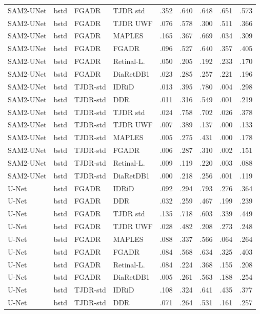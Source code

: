 \begin{landscape}
{\begin{longtable}{l l l l c c c c c}
SAM2-UNet & bstd & FGADR & TJDR std & .352 & .640 & .648 & .651 & .573 \\
SAM2-UNet & bstd & FGADR & TJDR UWF & .076 & .578 & .300 & .511 & .366 \\
SAM2-UNet & bstd & FGADR & MAPLES & .165 & .367 & .669 & .034 & .309 \\
SAM2-UNet & bstd & FGADR & FGADR & .096 & .527 & .640 & .357 & .405 \\
SAM2-UNet & bstd & FGADR & Retinal-L. & .050 & .205 & .192 & .233 & .170 \\
SAM2-UNet & bstd & FGADR & DiaRetDB1 & .023 & .285 & .257 & .221 & .196 \\
SAM2-UNet & bstd & TJDR-std & IDRiD & .013 & .395 & .780 & .004 & .298 \\
SAM2-UNet & bstd & TJDR-std & DDR & .011 & .316 & .549 & .001 & .219 \\
SAM2-UNet & bstd & TJDR-std & TJDR std & .024 & .758 & .702 & .026 & .378 \\
SAM2-UNet & bstd & TJDR-std & TJDR UWF & .007 & .389 & .137 & .000 & .133 \\
SAM2-UNet & bstd & TJDR-std & MAPLES & .005 & .275 & .431 & .000 & .178 \\
SAM2-UNet & bstd & TJDR-std & FGADR & .006 & .287 & .310 & .002 & .151 \\
SAM2-UNet & bstd & TJDR-std & Retinal-L. & .009 & .119 & .220 & .003 & .088 \\
SAM2-UNet & bstd & TJDR-std & DiaRetDB1 & .000 & .218 & .256 & .001 & .119 \\
U-Net & bstd & FGADR & IDRiD & .092 & .294 & .793 & .276 & .364 \\
U-Net & bstd & FGADR & DDR & .032 & .259 & .467 & .199 & .239 \\
U-Net & bstd & FGADR & TJDR std & .135 & .718 & .603 & .339 & .449 \\
U-Net & bstd & FGADR & TJDR UWF & .028 & .482 & .208 & .273 & .248 \\
U-Net & bstd & FGADR & MAPLES & .088 & .337 & .566 & .064 & .264 \\
U-Net & bstd & FGADR & FGADR & .084 & .568 & .634 & .325 & .403 \\
U-Net & bstd & FGADR & Retinal-L. & .084 & .224 & .368 & .155 & .208 \\
U-Net & bstd & FGADR & DiaRetDB1 & .005 & .261 & .563 & .188 & .254 \\
U-Net & bstd & TJDR-std & IDRiD & .108 & .324 & .641 & .435 & .377 \\
U-Net & bstd & TJDR-std & DDR & .071 & .264 & .531 & .161 & .257 \\

\end{longtable}}
\end{landscape}
